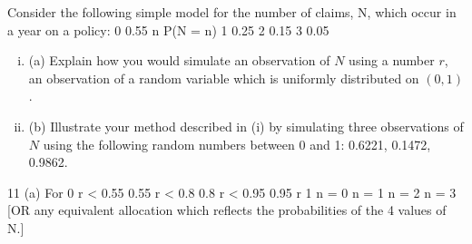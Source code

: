 \documentclass[a4paper,12pt]{article}
\begin{document}
Consider the following simple model for the number of claims, N, which occur in a  year on a policy:
0
0.55
n
P(N = n)
1
0.25
2
0.15
3
0.05
\begin{enumerate}[(i)]
\item (a) Explain how you would simulate an observation of $N$ using a number $r$, an observation of a random variable which is uniformly distributed on $(0, 1)$.
\item (b) Illustrate your method described in (i) by simulating three observations of $N$ using the following random numbers between 0 and 1: 0.6221, 0.1472, 0.9862.
\end{enumerate}


11
(a)
For 0 r < 0.55
0.55 r < 0.8
0.8 r < 0.95
0.95 r 1
n = 0
n = 1
n = 2
n = 3
[OR any equivalent allocation which reflects the probabilities of the 4 values
of N.]
\end{document}
